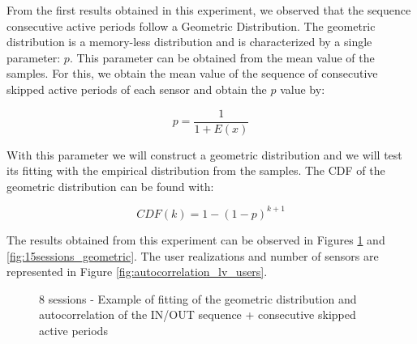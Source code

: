From the first results obtained in this experiment, we observed that the sequence consecutive active periods follow a Geometric Distribution. The geometric distribution is a memory-less distribution and is characterized by a single parameter: $p$. This parameter can be obtained from the mean value of the samples. For this, we obtain the mean value of the sequence of consecutive skipped active periods of each sensor and obtain the $p$ value by:

\begin{equation}
	p = \frac{1}{1+E(x)}
	\label{eq:p_geometric}
\end{equation}

With this parameter we will construct a geometric distribution and we will test its fitting with the empirical distribution from the samples. The CDF of the geometric distribution can be found with:

\begin{equation}
	CDF(k) = 1 - (1 - p)^{k+1} 
	\label{eq:geometric_cdf}
\end{equation}

The results obtained from this experiment can be observed in Figures \ref{fig:8sessions_geometric} and \ref{fig:15sessions_geometric}. The user realizations and number of sensors are represented in Figure \ref{fig:autocorrelation_lv_users}.

\begin{figure}[h!]
	\centering
	\caption{8 sessions - Example of fitting of the geometric distribution and autocorrelation of the IN/OUT sequence + consecutive skipped active periods}
	\label{fig:8sessions_geometric}
\end{figure}

